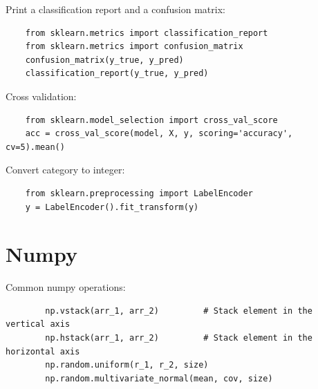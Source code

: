 \documentclass[12pt]{report}
\begin{document}
        Print a classification report and a confusion matrix:
        \begin{verbatim}
    from sklearn.metrics import classification_report
    from sklearn.metrics import confusion_matrix
    confusion_matrix(y_true, y_pred)
    classification_report(y_true, y_pred)
        \end{verbatim}
        
        Cross validation:
        \begin{verbatim}
    from sklearn.model_selection import cross_val_score
    acc = cross_val_score(model, X, y, scoring='accuracy', cv=5).mean()
        \end{verbatim}
        
        Convert category to integer:
        \begin{verbatim}
    from sklearn.preprocessing import LabelEncoder
    y = LabelEncoder().fit_transform(y)
        \end{verbatim}
        
        
        
    \section{Numpy}
        Common numpy operations:
        \begin{verbatim}
        np.vstack(arr_1, arr_2)         # Stack element in the vertical axis
        np.hstack(arr_1, arr_2)         # Stack element in the horizontal axis
        np.random.uniform(r_1, r_2, size)
        np.random.multivariate_normal(mean, cov, size)
        \end{verbatim}
        
\end{document}
